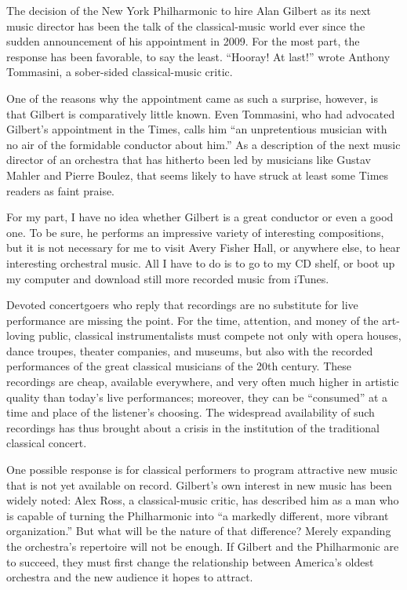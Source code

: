 The decision of the New York Philharmonic to hire Alan Gilbert as its next music director has been the talk of the classical-music world ever since the sudden announcement of his appointment in 2009. For the most part, the response has been favorable, to say the least. ``Hooray! At last!'' wrote Anthony Tommasini, a sober-sided classical-music critic.


One of the reasons why the appointment came as such a surprise, however, is that Gilbert is comparatively little known. Even Tommasini, who had advocated Gilbert's appointment in the Times, calls him ``an unpretentious musician with no air of the formidable conductor about him.'' As a description of the next music director of an orchestra that has hitherto been led by musicians like Gustav Mahler and Pierre Boulez, that seems likely to have struck at least some Times readers as faint praise.


For my part, I have no idea whether Gilbert is a great conductor or even a good one. To be sure, he performs an impressive variety of interesting compositions, but it is not necessary for me to visit Avery Fisher Hall, or anywhere else, to hear interesting orchestral music. All I have to do is to go to my CD shelf, or boot up my computer and download still more recorded music from iTunes.


Devoted concertgoers who reply that recordings are no substitute for live performance are missing the point. For the time, attention, and money of the art-loving public, classical instrumentalists must compete not only with opera houses, dance troupes, theater companies, and museums, but also with the recorded performances of the great classical musicians of the 20th century. These recordings are cheap, available everywhere, and very often much higher in artistic quality than today's live performances; moreover, they can be ``consumed'' at a time and place of the listener's choosing. The widespread availability of such recordings has thus brought about a crisis in the institution of the traditional classical concert.


One possible response is for classical performers to program attractive new music that is not yet available on record. Gilbert's own interest in new music has been widely noted: Alex Ross, a classical-music critic, has described him as a man who is capable of turning the Philharmonic into ``a markedly different, more vibrant organization.'' But what will be the nature of that difference? Merely expanding the orchestra's repertoire will not be enough. If Gilbert and the Philharmonic are to succeed, they must first change the relationship between America's oldest orchestra and the new audience it hopes to attract.